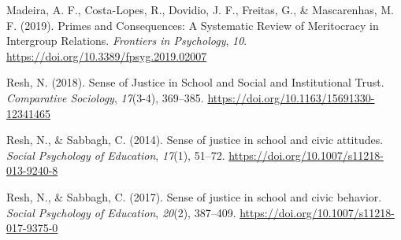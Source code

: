\documentclass[
  12pt,
]{article}
\newlength{\cslhangindent}
\newenvironment{cslreferences}%
  {\setlength{\parindent}{0pt}%
  \everypar{\setlength{\hangindent}{\cslhangindent}}\ignorespaces}%
  {\par}
\begin{document}
\begin{cslreferences}
\leavevmode\hypertarget{ref-madeira_Primes_2019}{}%
Madeira, A. F., Costa-Lopes, R., Dovidio, J. F., Freitas, G., \&
Mascarenhas, M. F. (2019). Primes and Consequences: A Systematic Review
of Meritocracy in Intergroup Relations. \emph{Frontiers in Psychology},
\emph{10}. \url{https://doi.org/10.3389/fpsyg.2019.02007}

\leavevmode\hypertarget{ref-resh_Sense_2018}{}%
Resh, N. (2018). Sense of Justice in School and Social and Institutional
Trust. \emph{Comparative Sociology}, \emph{17}(3-4), 369--385.
\url{https://doi.org/10.1163/15691330-12341465}

\leavevmode\hypertarget{ref-resh_Sense_2014}{}%
Resh, N., \& Sabbagh, C. (2014). Sense of justice in school and civic
attitudes. \emph{Social Psychology of Education}, \emph{17}(1), 51--72.
\url{https://doi.org/10.1007/s11218-013-9240-8}

\leavevmode\hypertarget{ref-resh_Sense_2017}{}%
Resh, N., \& Sabbagh, C. (2017). Sense of justice in school and civic
behavior. \emph{Social Psychology of Education}, \emph{20}(2), 387--409.
\url{https://doi.org/10.1007/s11218-017-9375-0}
\end{cslreferences}
\end{document}
